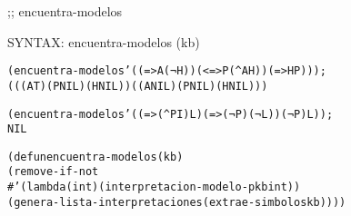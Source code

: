 \begin{aibox}{\function}
;; encuentra-modelos

SYNTAX: encuentra-modelos (kb) 
\end{aibox}

\begin{aibox}{\examples}
\begin{alltt}
(encuentra-modelos '((=> A (¬ H)) (<=> P (^ A  H)) (=> H P))) ;
 (((A T) (P NIL) (H NIL)) ((A NIL) (P NIL) (H NIL)))

(encuentra-modelos '((=> (^ P I)  L)  (=> (¬ P) (¬ L)) (¬ P) L)) ;
 NIL

\end{alltt}

\end{aibox}

\begin{aibox}{\comments}

\end{aibox}
\begin{aibox}{\answers}

\end{aibox}
\begin{aibox}{\othercomments}

\end{aibox}
\begin{aibox}{\pseudocode}

\end{aibox}
\begin{aibox}{\code}

\begin{alltt}

(defun encuentra-modelos (kb) 
  (remove-if-not 
    #'(lambda (int) (interpretacion-modelo-p kb int)) 
    (genera-lista-interpretaciones (extrae-simbolos kb))))

\end{alltt}
\end{aibox}
